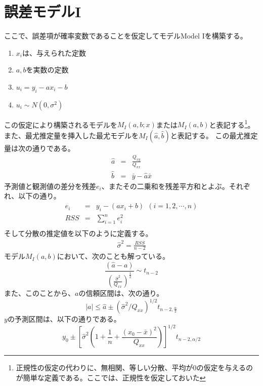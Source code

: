 \section{誤差モデルI}
ここで、誤差項が確率変数であることを仮定してモデルModel Iを構築する。
\begin{enumerate}
 \item $x_i$は、与えられた定数
 \item $a,b$を実数の定数
 \item $u_i = y_i-a x_i -b$
 \item $u_i \sim N(0,\sigma^2)$
\end{enumerate}
この仮定により構築されるモデルを$M_{I}(a,b; x)$または$M_I(a,b)$と表記する\footnote{正規性の仮定の代わりに、無相関、等しい分散、平均が$0$の仮定を与えるのが簡単な定義である。ここでは、正規性を仮定しておいた}。
また、最尤推定量を挿入した最尤モデルを$M_I(\hat{a},\hat{b})$と表記する。
この最尤推定量は次の通りである。
\begin{eqnarray*}
 \hat{a} &=& \frac{Q_{xy}}{Q_{xx}}\\
 \hat{b} &=& \bar{y}-\hat{a}\bar{x}
\end{eqnarray*}
予測値と観測値の差分を残差$e_i$、またその二乗和を残差平方和とよぶ。それぞれ、以下の通り。
\begin{eqnarray*}
 e_i &=& y_i - (ax_i+b)\ \ (i=1,2,\cdots,n)\\
 RSS &=& \sum_{i=1}^n e_i^2 \\
\end{eqnarray*}
そして分散の推定値を以下のように定義する。
\begin{eqnarray*}
 \hat{\sigma}^2 = \frac{RSS}{n-2}
\end{eqnarray*}
モデル$M_I(a,b)$において、次のことも解っている。
\begin{equation*}
 \frac{(\hat{a}-a)}{ \left( \frac{\hat{\sigma}^2}{Q_{xx}} \right)^\frac{1}{2}} \sim t_{n-2}
\end{equation*}
また、このことから、$a$の信頼区間は、次の通り。
\begin{equation*}
 |a| \leq \hat{a}\pm(\hat{\sigma}^2/Q_{xx})^{1/2}t_{n-2,\frac{\alpha}{2}}
\end{equation*}
$y$の予測区間は、以下の通りである。
\begin{equation*}
 y_0\pm\left[\hat{\sigma}^2\left( 1+\frac{1}{n} +\frac{(x_0-\bar{x})^2}{Q_{xx}} \right)\right]^{1/2}t_{n-2,\alpha/2}
\end{equation*}



